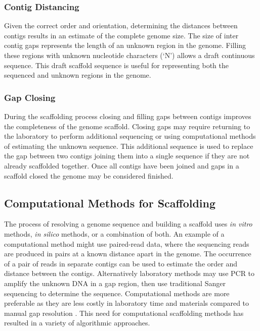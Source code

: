 \documentclass[10pt]{bmc_article}
\newenvironment{bmcformat}{\begin{raggedright}\baselineskip20pt\sloppy\setboolean{publ}{false}}{\end{raggedright}\baselineskip20pt\sloppy}
\begin{document}
\begin{bmcformat}
\subsubsection*{Contig Distancing} %

Given the correct order and orientation, determining the distances between
contigs results in an estimate of the complete genome size. The size of inter
contig gaps represents the length of an unknown region in the genome. Filling
these regions with unknown nucleotide characters (`N') allows a draft
continuous sequence. This draft scaffold sequence is useful for representing
both the sequenced and unknown regions in the genome.

\subsubsection*{Gap Closing} %

During the scaffolding process closing and filling gaps between contigs
improves the completeness of the genome scaffold. Closing gaps may require
returning to the laboratory to perform additional sequencing or using
computational methods of estimating the unknown sequence. This additional
sequence is used to replace the gap between two contigs joining them into
a single sequence if they are not already scaffolded together. Once all contigs
have been joined and gaps in a scaffold closed the genome may be considered
finished.

\subsection*{Computational Methods for Scaffolding} %

The process of resolving a genome sequence and building a scaffold uses
\emph{in vitro} methods, \emph{in silico} methods, or a combination of both. An
example of a computational method might use paired-read data, where the
sequencing reads are produced in pairs at a known distance apart in the genome.
The occurrence of a pair of reads in separate contigs can be used to estimate
the order and distance between the contigs. Alternatively laboratory methods
may use PCR to amplify the unknown DNA in a gap region, then use traditional
Sanger sequencing to determine the sequence. Computational methods are more
preferable as they are less costly in laboratory time and materials compared to
manual gap resolution \cite{nagarajan2010}. This need for computational
scaffolding methods has resulted in a variety of algorithmic approaches. \pb


\end{bmcformat}
\end{document}
